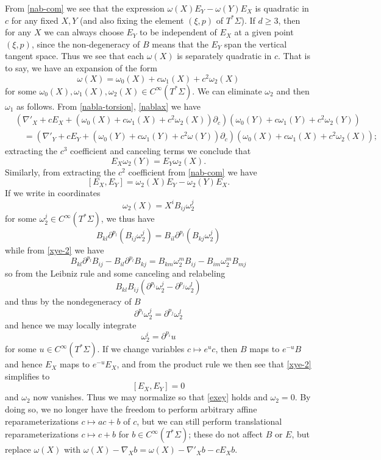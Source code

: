 \documentclass{article}
\numberwithin{equation}{section}
\theoremstyle{plain}
\begin{document}
From \eqref{nab-com} we see that the expression $\omega(X) E_Y - \omega(Y) E_X$ is quadratic in $c$ for any fixed $X,Y$ (and also fixing the element $(\xi,p)$ of $T^* \Sigma$).  If $d \geq 3$, then for any $X$ we can always choose $E_Y$ to be independent of $E_X$ at a given point $(\xi,p)$, since the non-degeneracy of $B$ means that the $E_Y$ span the vertical tangent space.  Thus we see that each $\omega(X)$ is separately quadratic in $c$.  That is to say, we have an expansion of the form
$$ \omega(X) = \omega_0(X) + c \omega_1(X) + c^2 \omega_2(X)$$
for some $\omega_0(X), \omega_1(X), \omega_2(X) \in C^\infty(T^* \Sigma)$.
We can eliminate $\omega_2$ and then $\omega_1$ as follows.  From \eqref{nabla-torsion}, \eqref{nablax} we have
\begin{equation}\label{naba-2}
\begin{split}
    &    (\nabla'_X + c E_X + (\omega_0(X) + c \omega_1(X) + c^2 \omega_2(X)) \partial_c) (\omega_0(Y) + c \omega_1(Y) + c^2 \omega_2(Y))\\
&\quad     =
(\nabla'_Y + c E_Y + (\omega_0(Y) + c \omega_1(Y) + c^2 \omega(Y)) \partial_c) (\omega_0(X) + c \omega_1(X) + c^2 \omega_2(X));
\end{split}
\end{equation}
extracting the $c^3$ coefficient and canceling terms we conclude that
$$ E_X \omega_2(Y) = E_Y \omega_2(X).$$
Similarly, from extracting the $c^2$ coefficient from \eqref{nab-com} we have
\begin{equation}\label{xye-2}
    [E_X,E_Y] = \omega_2(X) E_Y - \omega_2(Y) E_X.
\end{equation}
If we write in coordinates
$$ \omega_2(X) = X^i B_{ij}  \omega_2^j$$
for some $\omega_2^j \in C^\infty(T^* \Sigma)$, we thus have
$$ B_{kl} \partial^{p_l} (B_{ij}  \omega_2^j) = B_{il} \partial^{p_l} (B_{kj}  \omega_2^j)$$
while from \eqref{xye-2} we have
$$ B_{kl} \partial^{p_l} B_{ij} - B_{il} \partial^{p_l} B_{kj} = B_{km} \omega_2^m B_{ij} - B_{im} \omega_2^m B_{mj} $$
so from the Leibniz rule and some canceling and relabeling
$$ B_{kl} B_{ij}  (\partial^{p_l} \omega_2^j - \partial^{p_j} \omega_2^l)$$
and thus by the nondegeneracy of $B$
$$ \partial^{p_l}  \omega_2^j = \partial^{p_j}  \omega_2^l$$
and hence we may locally integrate
$$ \omega_2^i = \partial^{p_i} u$$
for some $u \in C^\infty(T^* \Sigma)$.
If we change variables $c \mapsto e^u c$, then $B$ maps to $e^{-u} B$ and hence $E_X$ maps to $e^{-u} E_X$, and from the product rule we then see that \eqref{xye-2} simplifies to
\begin{equation}\label{exey}
    [E_X,E_Y] = 0
\end{equation}
and $\omega_2$ now vanishes. Thus we may normalize so that \eqref{exey} holds and $\omega_2=0$.  By doing so, we no longer have the freedom to perform arbitrary affine reparameterizations $c \mapsto ac+b$ of $c$, but we can still perform translational reparameterizations $c \mapsto c+b$ for $b \in C^\infty(T^* \Sigma)$; these do not affect $B$ or $E$, but replace $\omega(X)$ with $\omega(X) - \nabla_X b = \omega(X) - \nabla'_X b - c E_X b$.\\
\end{document}
